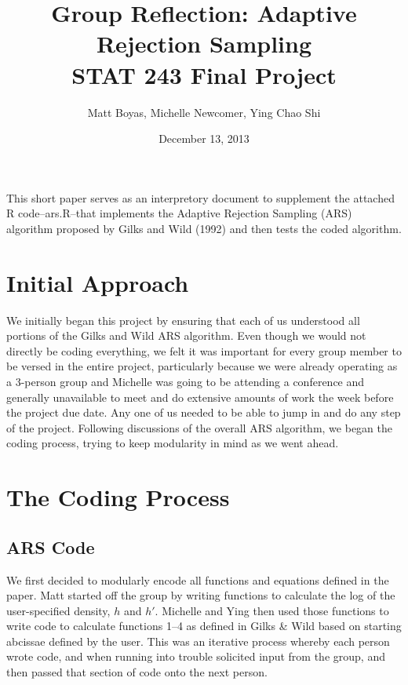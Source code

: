 \documentclass{article}
\begin{document}
\lstset{language=R, basicstyle=\ttfamily, columns=flexible, breaklines=TRUE}
    
\title{Group Reflection: Adaptive Rejection Sampling\\STAT 243 Final Project}
\author{Matt Boyas, Michelle Newcomer, Ying Chao Shi}

\date{December 13, 2013}
\maketitle
This short paper serves as an interpretory document to supplement the attached R code--ars.R--that implements the Adaptive Rejection Sampling (ARS) algorithm proposed by Gilks and Wild (1992) and then tests the coded algorithm.
\section{Initial Approach}
We initially began this project by ensuring that each of us understood all portions of the Gilks and Wild ARS algorithm.  Even though we would not directly be coding everything, we felt it was important for every group member to be versed in the entire project, particularly because we were already operating as a 3-person group and Michelle was going to be attending a conference and generally unavailable to meet and do extensive amounts of work the week before the project due date.  Any one of us needed to be able to jump in and do any step of the project.  Following discussions of the overall ARS algorithm, we began the coding process, trying to keep modularity in mind as we went ahead. 
 
\section{The Coding Process}
\subsection{ARS Code}
We first decided to modularly encode all functions and equations defined in the paper.  Matt started off the group by writing functions to calculate the log of the user-specified density, $h$ and $h'$.  Michelle and Ying then used those functions to write code to calculate functions 1--4 as defined in Gilks \& Wild based on starting abcissae defined by the user. This was an iterative process whereby each person wrote code, and when running into trouble solicited input from the group, and then passed that section of code onto the next person. 
\end{document}
